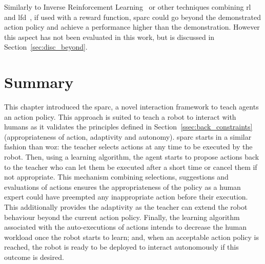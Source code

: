 Similarly to Inverse Reinforcement Learning~\citep{abbeel2004apprenticeship} or other techniques combining \gls{rl} and \gls{lfd}~\citep{billard2008robot}, if used with a reward function, \gls{sparc} could go beyond the demonstrated action policy and achieve a performance higher than the demonstration. However this aspect has not been evaluated in this work, but is discussed in Section~\ref{sec:disc_beyond}.

\section{Summary}
    
This chapter introduced the \acrfull{sparc}, a novel interaction framework to teach agents an action policy. This approach is suited to teach a robot to interact with humans as it validates the principles defined in Section~\ref{ssec:back_constraints} (appropriateness of action, adaptivity and autonomy). \gls{sparc} starts in a similar fashion than \gls{woz}: the teacher selects actions at any time to be executed by the robot. Then, using a learning algorithm, the agent starts to propose actions back to the teacher who can let them be executed after a short time or cancel them if not appropriate. This mechanism combining selections, suggestions and evaluations of actions ensures the appropriateness of the policy as a human expert could have preempted any inappropriate action before their execution. This additionally provides the adaptivity as the teacher can extend the robot behaviour beyond the current action policy. Finally, the learning algorithm associated with the auto-executions of actions intends to decrease the human workload once the robot starts to learn; and, when an acceptable action policy is reached, the robot is ready to be deployed to interact autonomously if this outcome is desired.
